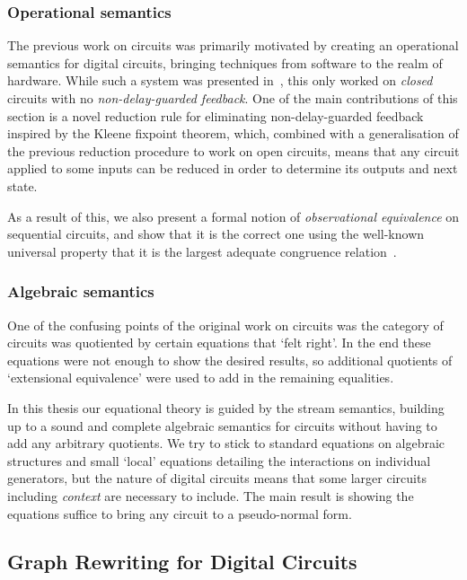 \subsubsection{Operational semantics}

The previous work on circuits was primarily motivated by creating an operational
semantics for digital circuits, bringing techniques from software to the realm
of hardware.
While such a system was presented in~\cite{ghica2017diagrammatic}, this only
worked on \emph{closed} circuits with no \emph{non-delay-guarded feedback}.
One of the main contributions of this section is a novel reduction rule for
eliminating non-delay-guarded feedback inspired by the Kleene fixpoint theorem,
which, combined with a generalisation of the previous reduction procedure to
work on open circuits, means that any circuit applied to some inputs can be
reduced in order to determine its outputs and next state.

As a result of this, we also present a formal notion of
\emph{observational equivalence} on sequential circuits, and show that it is the
correct one using the well-known universal property that it is the largest
adequate congruence relation~\cite{gordon1998operational}.

\subsubsection{Algebraic semantics}

One of the confusing points of the original work on circuits was the category
of circuits was quotiented by certain equations that `felt right'.
In the end these equations were not enough to show the desired results,
so additional quotients of `extensional equivalence' were used to add in the
remaining equalities.

In this thesis our equational theory is guided by the stream semantics,
building up to a sound and complete algebraic semantics for circuits without
having to add any arbitrary quotients.
We try to stick to standard equations on algebraic structures and small `local'
equations detailing the interactions on individual generators, but the nature of
digital circuits means that some larger circuits including \emph{context} are
necessary to include.
The main result is showing the equations suffice to bring any circuit to a
pseudo-normal form.

\subsection{Graph Rewriting for Digital Circuits}

